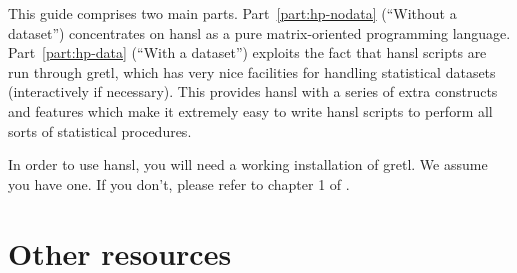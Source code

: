 \documentclass[oneside]{book}
\begin{document}
This guide comprises two main parts. Part~\ref{part:hp-nodata}
(``Without a dataset'') concentrates on hansl as a pure
matrix-oriented programming language. Part~\ref{part:hp-data} (``With
a dataset'') exploits the fact that hansl scripts are run through
gretl, which has very nice facilities for handling statistical
datasets (interactively if necessary). This provides hansl with a
series of extra constructs and features which make it extremely easy
to write hansl scripts to perform all sorts of statistical procedures.


In order to use hansl, you will need a working installation of
gretl. We assume you have one. If you don't, please refer to chapter 1
of \GUG.

\section*{Other resources}
\end{document}
